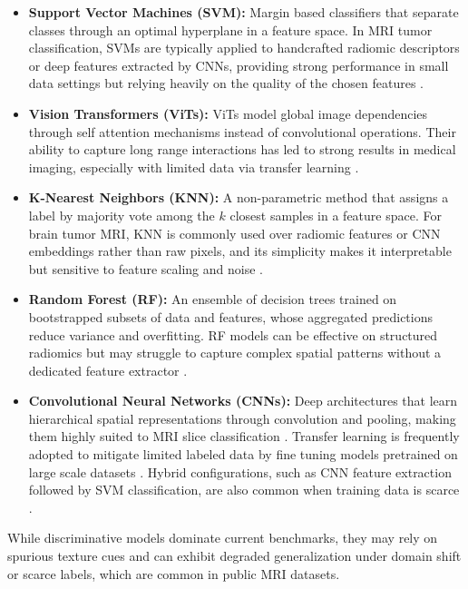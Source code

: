 \begin{itemize}
    \item \textbf{Support Vector Machines (SVM):} Margin based classifiers that separate classes through an optimal hyperplane in a feature space. In MRI tumor classification, SVMs are typically applied to handcrafted radiomic descriptors or deep features extracted by CNNs, providing strong performance in small data settings but relying heavily on the quality of the chosen features \cite{hayat2024cnnsvm}.

    \item \textbf{Vision Transformers (ViTs):} ViTs model global image dependencies through self attention mechanisms instead of convolutional operations. Their ability to capture long range interactions has led to strong results in medical imaging, especially with limited data via transfer learning \cite{dosovitskiy2021imageworth16x16words}.

    \item \textbf{K-Nearest Neighbors (KNN):} A non-parametric method that assigns a label by majority vote among the $k$ closest samples in a feature space. For brain tumor MRI, KNN is commonly used over radiomic features or CNN embeddings rather than raw pixels, and its simplicity makes it interpretable but sensitive to feature scaling and noise \cite{venkatesh2019knn}.

    \item \textbf{Random Forest (RF):} An ensemble of decision trees trained on bootstrapped subsets of data and features, whose aggregated predictions reduce variance and overfitting. RF models can be effective on structured radiomics but may struggle to capture complex spatial patterns without a dedicated feature extractor \cite{salman2024randomforest}.

    \item \textbf{Convolutional Neural Networks (CNNs):} Deep architectures that learn hierarchical spatial representations through convolution and pooling, making them highly suited to MRI slice classification \cite{liu2025cnnml}. Transfer learning is frequently adopted to mitigate limited labeled data by fine tuning models pretrained on large scale datasets \cite{kaur2020transfer}. Hybrid configurations, such as CNN feature extraction followed by SVM classification, are also common when training data is scarce \cite{raza2022hybrid, hayat2024cnnsvm, ayadi2022hybrid}.
\end{itemize}

While discriminative models dominate current benchmarks, they may rely on spurious texture cues and can exhibit degraded generalization under domain shift or scarce labels, which are common in public MRI datasets.

